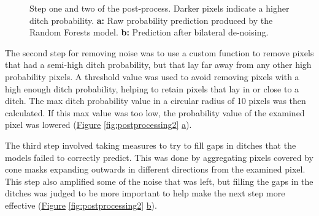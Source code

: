 \documentclass[]{interact}
\theoremstyle{plain}%
\theoremstyle{definition}
\theoremstyle{remark}
\begin{document}
\begin{figure} [!htb]
    \caption{Step one and two of the post-process. Darker pixels indicate a higher ditch probability. \textbf{a: }Raw probability prediction produced by the Random Forests model. \textbf{b: }Prediction after bilateral de-noising.}
    \label{fig:postprocessing1}
\end{figure}

The second step for removing noise was to use a custom function to remove pixels that had a semi-high ditch probability, but that lay far away from any other high probability pixels. A threshold value was used to avoid removing pixels with a high enough ditch probability, helping to retain pixels that lay in or close to a ditch. The max ditch probability value in a circular radius of 10 pixels was then calculated. If this max value was too low, the probability value of the examined pixel was lowered (\hyperref[fig:postprocessing2]{Figure} \ref{fig:postprocessing2} \hyperref[fig:postprocessing2]{a}).

The third step involved taking measures to try to fill gaps in ditches that the models failed to correctly predict. This was done by aggregating pixels covered by cone masks expanding outwards in different directions from the examined pixel. This step also amplified some of the noise that was left, but filling the gaps in the ditches was judged to be more important to help make the next step more effective (\hyperref[fig:postprocessing2]{Figure} \ref{fig:postprocessing2} \hyperref[fig:postprocessing2]{b}).
\end{document}
